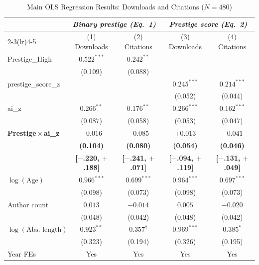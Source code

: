 \documentclass[12pt,a4paper]{article}
\begin{document}
\newpage

\begin{table}[htbp]
\centering
\caption{Main OLS Regression Results: Downloads and Citations ($N = 480$)}
\label{tab:main}
\begin{threeparttable}
\small
\begin{tabular}{lcccc}
\toprule
 & \multicolumn{2}{c}{\textit{Binary prestige (Eq.~1)}}
 & \multicolumn{2}{c}{\textit{Prestige score (Eq.~2)}} \\
\cmidrule(lr){2-3}\cmidrule(lr){4-5}
 & (1) Downloads & (2) Citations & (3) Downloads & (4) Citations \\
\midrule
Prestige\_High
  & $0.522^{***}$ & $0.242^{**}$  &               &              \\
  & (0.109)       & (0.088)       &               &              \\[4pt]
prestige\_score\_z
  &               &               & $0.245^{***}$ & $0.214^{***}$ \\
  &               &               & (0.052)       & (0.044)       \\[4pt]
ai\_z
  & $0.266^{**}$  & $0.176^{**}$  & $0.266^{***}$ & $0.162^{***}$ \\
  & (0.087)       & (0.058)       & (0.053)       & (0.047)       \\[4pt]
\textbf{Prestige\,$\times$\,ai\_z}
  & $\mathbf{-0.016}$  & $\mathbf{-0.085}$ & $\mathbf{+0.013}$ & $\mathbf{-0.041}$ \\
  & \textbf{(0.104)}   & \textbf{(0.080)}  & \textbf{(0.054)}  & \textbf{(0.046)}  \\
  & \textbf{[$-$.220, $+$.188]} & \textbf{[$-$.241, $+$.071]}
  & \textbf{[$-$.094, $+$.119]} & \textbf{[$-$.131, $+$.049]} \\[4pt]
$\log(\text{Age})$
  & $0.966^{***}$ & $0.699^{***}$ & $0.964^{***}$ & $0.697^{***}$ \\
  & (0.098)       & (0.073)       & (0.098)       & (0.073)       \\[4pt]
Author count
  & $0.013$       & $-0.014$      & $0.005$       & $-0.020$      \\
  & (0.048)       & (0.042)       & (0.048)       & (0.042)       \\[4pt]
$\log(\text{Abs. length})$
  & $0.923^{**}$  & $0.357^{\dagger}$ & $0.969^{***}$ & $0.385^{*}$ \\
  & (0.323)       & (0.194)       & (0.326)       & (0.195)       \\[4pt]
\midrule
Year FEs           & Yes  & Yes  & Yes  & Yes  \\

\end{tabular}
\end{threeparttable}
\end{table}
\end{document}
